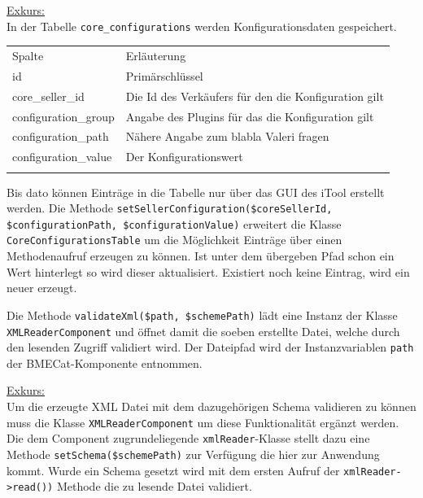 	\begin{addmargin}[1cm]{1cm}
	\underline{Exkurs:}\\
	 In der Tabelle \texttt{core\_configurations} werden Konfigurationsdaten gespeichert. 	 
	 \begin{table}[!htbp]
	 \begin{addmargin}[1cm]{1cm}
	 \centering
		 		\begin{tabularx}{\linewidth}{p{4cm} X}
		 		\rowcolor[HTML]{EFEFEF} 
		 		Spalte & Erläuterung \\ \cline{1-2} \addlinespace[7pt]
		 		id & Primärschlüssel \\
		 		core\_seller\_id & Die Id des Verkäufers für den die Konfiguration gilt \\
		 		configuration\_group & Angabe des Plugins für das die Konfiguration gilt \\
		 		configuration\_path & Nähere Angabe zum blabla Valeri fragen \\
		 		configuration\_value & Der Konfigurationswert \\\addlinespace[7pt] \cline{1-2} 
		 		\end{tabularx}%
		 	\end{addmargin}
		 	\end{table}
	 
	 Bis dato können Einträge in die Tabelle nur über das GUI des iTool erstellt werden. Die Methode \texttt{setSellerConfiguration(\$coreSellerId, \$configurationPath, \$configurationValue)} erweitert die Klasse \texttt{CoreConfigurationsTable} um die Möglichkeit Einträge über einen Methodenaufruf erzeugen zu können. Ist unter dem übergeben Pfad schon ein Wert hinterlegt so wird dieser aktualisiert. Existiert noch keine Eintrag, wird ein neuer erzeugt.
		\end{addmargin}
	
	Die Methode \texttt{validateXml(\$path, \$schemePath)} lädt eine Instanz der Klasse \texttt{XMLReaderComponent} und öffnet damit die soeben erstellte Datei, welche durch den lesenden Zugriff validiert wird. Der Dateipfad wird der Instanzvariablen \texttt{path} der BMECat-Komponente entnommen.
	
		\begin{addmargin}[1cm]{1cm}
		\underline{Exkurs:}\\
		Um die erzeugte XML Datei mit dem dazugehörigen Schema validieren zu können muss die Klasse \texttt{XMLReaderComponent} um diese Funktionalität ergänzt werden. Die dem Component zugrundeliegende \texttt{xmlReader}-Klasse stellt dazu eine Methode \texttt{setSchema(\$schemePath)} zur Verfügung die hier zur Anwendung kommt. Wurde ein Schema gesetzt wird mit dem ersten Aufruf der \texttt{xmlReader->read())} Methode die zu lesende Datei validiert. 
		\end{addmargin}
	
